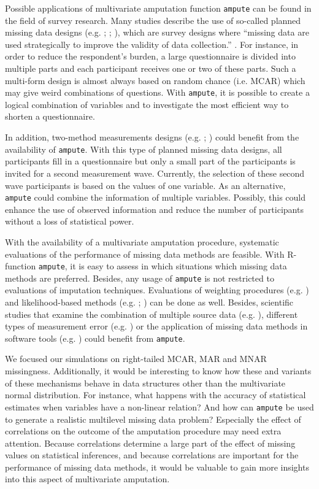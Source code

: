 \documentclass[11pt,a4paper]{article}
\newcommand{\code}[1]{\texttt{#1}}
\begin{document}
Possible applications of multivariate amputation function \code{ampute} can be found in the field of survey research. Many studies describe the use of so-called planned missing data designs (e.g. \citealp{Enders}; \citealp{Wu}; \citealp{Bunting}), which are survey designs where ``missing data are used strategically to improve the validity of data collection.'' \citep[][p. 426]{Rhemtulla2012}. For instance, in order to reduce the respondent's burden, a large questionnaire is divided into multiple parts and each participant receives one or two of these parts. Such a multi-form design is almost always based on random chance (i.e. MCAR) which may give weird combinations of questions. With \code{ampute}, it is possible to create a logical combination of variables and to investigate the most efficient way to shorten a questionnaire. 

In addition, two-method measurements designs (e.g. \citealp{Graham2006}; \citealp{Rhemtulla2012}) could benefit from the availability of \code{ampute}. With this type of planned missing data designs, all participants fill in a questionnaire but only a small part of the participants is invited for a second measurement wave. Currently, the selection of these second wave participants is based on the values of one variable. As an alternative, \code{ampute} could combine the information of multiple variables. Possibly, this could enhance the use of observed information and reduce the number of participants without a loss of statistical power. 

With the availability of a multivariate amputation procedure, systematic evaluations of the performance of missing data methods are feasible. With R-function \code{ampute}, it is easy to assess in which situations which missing data methods are preferred. Besides, any usage of \code{ampute} is not restricted to evaluations of imputation techniques. Evaluations of weighting procedures (e.g. \citealp{Boeschoten2017}) and likelihood-based methods (e.g. \citealp{Little2002}; \citealp{Molenberghs2007}) can be done as well. Besides, scientific studies that examine the combination of multiple source data (e.g. \citealp{Waal2017}), different types of measurement error (e.g. \citealp{Waal2016}) or the application of missing data methods in software tools (e.g. \citealp{Horton}) could benefit from \code{ampute}.

We focused our simulations on right-tailed MCAR, MAR and MNAR missingness. Additionally, it would be interesting to know how these and variants of these mechanisms behave in data structures other than the multivariate normal distribution. For instance, what happens with the accuracy of statistical estimates when variables have a non-linear relation? And how can \code{ampute} be used to generate a realistic multilevel missing data problem? Especially the effect of correlations on the outcome of the amputation procedure may need extra attention. Because correlations determine a large part of the effect of missing values on statistical inferences, and because correlations are important for the performance of missing data methods, it would be valuable to gain more insights into this aspect of multivariate amputation. 
\end{document}
